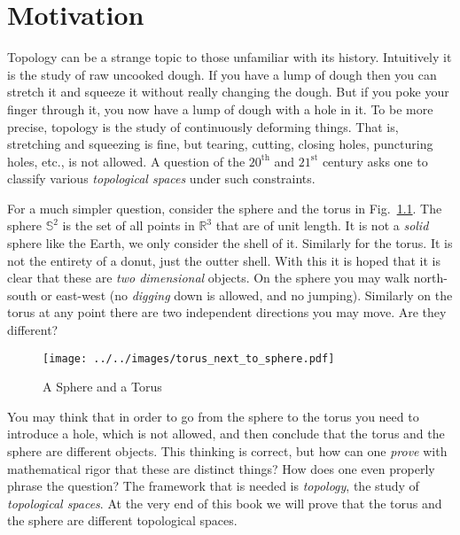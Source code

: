 \chapter{Motivation}
    Topology can be a strange topic to those unfamiliar with its history.
    Intuitively it is the study of raw uncooked dough. If you have a lump of
    dough then you can stretch it and squeeze it without really changing the
    dough. But if you poke your finger through it, you now have a lump of dough
    with a hole in it. To be more precise, topology is the study of continuously
    deforming things. That is, stretching and squeezing is fine, but tearing,
    cutting, closing holes, puncturing holes, etc., is not allowed. A question
    of the $20^{\textrm{th}}$ and $21^{\textrm{st}}$ century asks one to
    classify various \textit{topological spaces} under such constraints.
    \par\hfill\par
    For a much simpler question, consider the sphere and the torus in
    Fig.~\ref{fig:sphere_and_torus}. The sphere $\mathbb{S}^{2}$ is the set of
    all points in $\mathbb{R}^{3}$ that are of unit length. It is not a
    \textit{solid} sphere like the Earth, we only consider the shell of it.
    Similarly for the torus. It is not the entirety of a donut, just the outter
    shell. With this it is hoped that it is clear that these are
    \textit{two dimensional} objects. On the sphere you may walk north-south or
    east-west (no \textit{digging} down is allowed, and no jumping). Similarly
    on the torus at any point there are two independent directions you may
    move. Are they different?
    \begin{figure}[H]
        \centering
        \texttt{[image: ../../images/torus\_next\_to\_sphere.pdf]}
        \caption{A Sphere and a Torus}
        \label{fig:sphere_and_torus}
    \end{figure}
    You may think that in order to go from the sphere to the torus you need to
    introduce a hole, which is not allowed, and then conclude that the torus
    and the sphere are different objects. This thinking is correct,
    but how can one \textit{prove} with mathematical rigor that these are
    distinct things? How does one even properly phrase the question? The
    framework that is needed is \textit{topology}, the study of
    \textit{topological spaces}. At the very end of this book we will prove that
    the torus and the sphere are different topological spaces.
    \par\hfill\par
